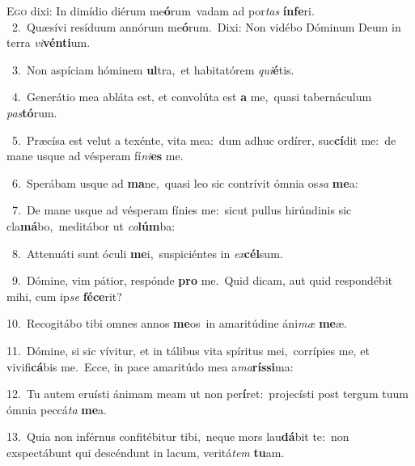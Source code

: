 \lettrine{\initial\textcolor{\initialcolor}{E}}{go} dixi: In dimídio diérum me\-\textbf{ó}\-rum~\star vadam ad por\textit{tas} \textbf{ín}\-\textbf{fe}ri.\\
{\numbfont\textcolor{\numbcolor}{~2.}}~Quæsívi resíduum annórum me\-\textbf{ó}\-rum.~\star Dixi: Non vidébo Dóminum Deum in terra \textit{vi}\-\textbf{vén}\textbf{ti}um.\par
{\numbfont\textcolor{\numbcolor}{~3.}}~Non aspíciam hóminem \textbf{ul}\-tra,~\star et habitatórem \textit{qui}\-\textbf{é}tis.\par
{\numbfont\textcolor{\numbcolor}{~4.}}~Generátio mea abláta est, et convolúta est \textbf{a} me,~\star quasi tabernáculum \textit{pas}\-\textbf{tó}rum.\par
{\numbfont\textcolor{\numbcolor}{~5.}}~Præcísa est velut a texénte, vita mea:~\dagger dum adhuc ordírer, suc\-\textbf{cí}\-dit me:~\star de mane usque ad vésperam fí\-\textit{ni}\-\textbf{es} me.\par
{\numbfont\textcolor{\numbcolor}{~6.}}~Sperábam usque ad \textbf{ma}\-ne,~\star quasi leo sic contrívit ómnia os\textit{sa} \textbf{me}\-a:\par
{\numbfont\textcolor{\numbcolor}{~7.}}~De mane usque ad vésperam fínies me:~\dagger sicut pullus hirúndinis sic cla\-\textbf{má}\-bo,~\star meditábor ut \textit{co}\-\textbf{lúm}ba:\par
{\numbfont\textcolor{\numbcolor}{~8.}}~Attenuáti sunt óculi \textbf{me}\-i,~\star suspiciéntes in \textit{ex}\-\textbf{cél}sum.\par
{\numbfont\textcolor{\numbcolor}{~9.}}~Dómine, vim pátior, respónde \textbf{pro} me.~\star Quid dicam, aut quid respondébit mihi, cum ip\textit{se} \textbf{fé}\-\textbf{ce}rit?\par
{\numbfont\textcolor{\numbcolor}{10.}}~Recogitábo tibi omnes annos \textbf{me}\-os~\star in amaritúdine áni\textit{mæ} \textbf{me}\-æ.\par
{\numbfont\textcolor{\numbcolor}{11.}}~Dómine, si sic vívitur, et in tálibus vita spíritus mei,~\dagger corrípies me, et vivifi\-\textbf{cá}\-bis me.~\star Ecce, in pace amaritúdo mea a\-\textit{ma}\-\textbf{rís}\textbf{si}ma:\par
{\numbfont\textcolor{\numbcolor}{12.}}~Tu autem eruísti ánimam meam ut non per\-\textbf{í}\-ret:~\star projecísti post tergum tuum ómnia peccá\textit{ta} \textbf{me}\-a.\par
{\numbfont\textcolor{\numbcolor}{13.}}~Quia non inférnus confitébitur tibi,~\dagger neque mors lau\-\textbf{dá}\-bit te:~\star non exspectábunt qui descéndunt in lacum, veritá\textit{tem} \textbf{tu}\-am.\par
